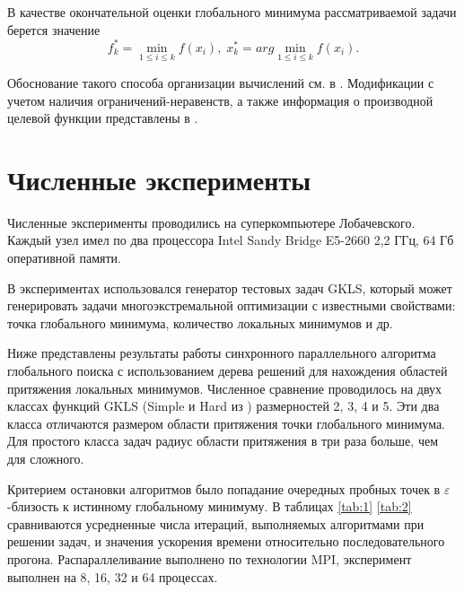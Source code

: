 \documentclass[runningheads]{llncs}
\begin{document}
В качестве окончательной оценки глобального минимума рассматриваемой задачи берется значение 
\begin{equation} 
	f_k^*=\min_{1\leq i \leq k}f(x_i), \; x_k^*=arg \min_{1\leq i \leq k}f(x_i). 
\end{equation} 


Обоснование такого способа организации вычислений см. в \cite{Strongin2000,Barkalov2016}. Модификации с учетом наличия ограничений-неравенств, а также информация о производной целевой функции представлены в \cite{Barkalov2002,Gergel1997}.





\section{Численные эксперименты}\label{SecR}


Численные эксперименты проводились на суперкомпьютере Лобачевского. Каждый узел имел по два процессора Intel Sandy Bridge E5-2660 2,2 ГГц, 64 Гб оперативной памяти.

В экспериментах использовался генератор тестовых задач GKLS, который может генерировать задачи многоэкстремальной оптимизации с известными свойствами: точка глобального минимума, количество локальных минимумов и др.


Ниже представлены результаты работы синхронного параллельного алгоритма глобального поиска  с использованием дерева решений для нахождения областей притяжения локальных минимумов. Численное сравнение проводилось на двух классах функций GKLS (Simple и Hard из \cite{Sergeyev2006}) размерностей 2, 3, 4 и 5.
Эти два класса отличаются размером области притяжения точки глобального минимума.
Для простого класса задач радиус области притяжения в три раза больше, чем для сложного.

Критерием остановки алгоритмов было попадание очередных пробных точек в $\varepsilon$-близость к истинному глобальному минимуму. В таблицах \ref{tab:1} \ref{tab:2} сравниваются усредненные числа итераций, выполняемых алгоритмами при решении задач, и значения ускорения времени относительно последовательного прогона. Распараллеливание выполнено по технологии MPI, эксперимент выполнен на 8, 16, 32 и 64 процессах.
\end{document}

